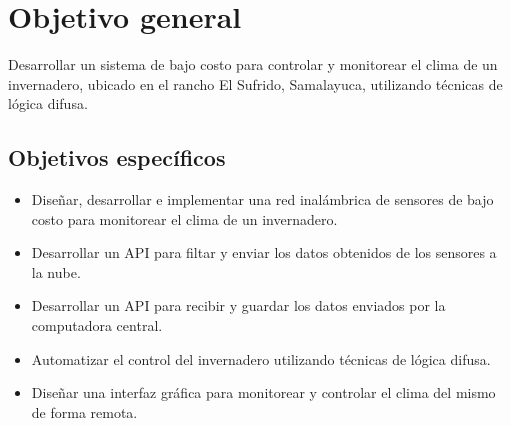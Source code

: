 \section{Objetivo general}
Desarrollar un sistema de bajo costo para controlar y monitorear el clima de un invernadero, ubicado en el rancho El Sufrido, Samalayuca, utilizando técnicas de lógica difusa.

\subsection{Objetivos específicos}
\begin{itemize}
	\item Diseñar, desarrollar e implementar una red inalámbrica de sensores de bajo costo para monitorear el clima de un invernadero.
	\item Desarrollar un API para filtar y enviar los datos obtenidos de los sensores a la nube.
	\item Desarrollar un API para recibir y guardar los datos enviados por la computadora central.
	\item Automatizar el control del invernadero utilizando técnicas de lógica difusa.
	\item Diseñar una interfaz gráfica para monitorear y controlar el clima del mismo de forma remota.
\end{itemize}
